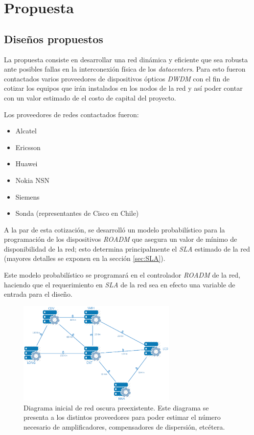 \section{Propuesta}
\label{sec:propuesta}



\subsection{Diseños propuestos}
\label{sec:disenos}

La propuesta consiste en desarrollar una red dinámica y eficiente que
sea robusta ante posibles fallas en la interconexión física de los
\emph{datacenters}. Para esto fueron contactados varios proveedores de
dispositivos ópticos \emph{DWDM} con el fin de cotizar los equipos que 
irán instalados en los nodos de la red y así poder contar con un valor 
estimado de el costo de capital del proyecto.

Los proveedores de redes contactados fueron:
\begin{itemize}
\item Alcatel
\item Ericsson
\item Huawei
\item Nokia NSN
\item Siemens
\item Sonda (representantes de Cisco en Chile)
\end{itemize}

A la par de esta cotización, se desarrolló un modelo probabilístico 
para la programación de los dispositivos \emph{ROADM}
que asegura un valor de mínimo de disponibilidad de la red; esto
determina principalmente el \emph{SLA} estimado de la red (mayores
detalles se exponen en la sección \ref{sec:SLA}).

Este modelo probabilístico se programará en el controlador
\emph{ROADM} de la red, haciendo que el requerimiento en \emph{SLA} de
la red sea en efecto una variable de entrada para el diseño.

\begin{figure}[h]
\centering
\includegraphics[width=0.7\textwidth]{Imagenes/Diagrama_Fibra_Oscura.eps}
\caption{Diagrama inicial de red oscura preexistente. Este diagrama se
  presenta a los distintos proveedores para poder estimar el
  número necesario de amplificadores, compensadores de dispersión,
  etcétera.}
\end{figure}

